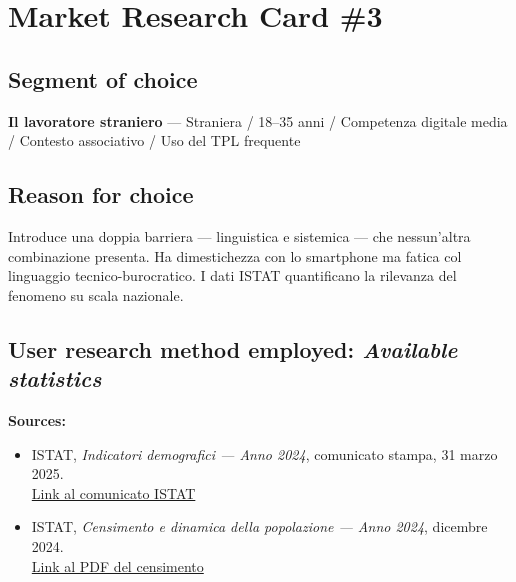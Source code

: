 \documentclass[11pt,a4paper]{article}
\begin{document}
\newpage
\section*{Market Research Card \#3}

\subsection*{Segment of choice}
\begin{tcolorbox}[colback=backgroundColor,colframe=borderColor,arc=2mm]
\textbf{Il lavoratore straniero} --- Straniera / 18--35 anni /
Competenza digitale media / Contesto associativo / Uso del TPL
frequente
\end{tcolorbox}

\subsection*{Reason for choice}
\begin{tcolorbox}[colback=backgroundColor,colframe=borderColor,arc=2mm]
Introduce una doppia barriera --- linguistica e sistemica --- che
nessun'altra combinazione presenta. Ha dimestichezza con lo smartphone
ma fatica col linguaggio tecnico-burocratico. I dati ISTAT quantificano
la rilevanza del fenomeno su scala nazionale.
\end{tcolorbox}

\subsection*{User research method employed: \textit{Available statistics}}
\begin{tcolorbox}[colback=backgroundColor,colframe=borderColor,arc=2mm]
\textbf{Sources:}
\begin{itemize}[leftmargin=*]
  \item ISTAT, \textit{Indicatori demografici --- Anno 2024},
  comunicato stampa, 31 marzo 2025.\\
  \href{https://www.istat.it/comunicato-stampa/indicatori-demografici-anno-2024/}{Link al comunicato ISTAT}

  \item ISTAT, \textit{Censimento e dinamica della popolazione --- Anno 2024}, dicembre 2024.\\
  \href{https://www.istat.it/wp-content/uploads/2025/12/Censimento-e-dinamica-della-popolazione-Anno-2024.pdf}{Link al PDF del censimento}
\end{itemize}
\end{tcolorbox}
\end{document}
